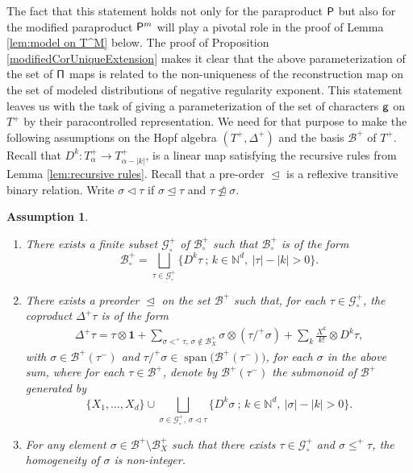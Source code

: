 \documentclass[JEP,XML,SOM,Unicode,published]{cedram}
\DeclareMathOperator{\Span}{span}
\theoremstyle{plain}
\newtheorem{assumption}{Assumption}
\theoremstyle{definition}
\newcommand{\unit}{\mathbf{1}}
\let\pord\trianglelefteq
\let\spord\triangleleft
\newcommand{\mcB}{\mathcal{B}}
\newcommand{\mcG}{\mathcal{G}}
\begin{document}
The fact that this statement holds not only for the paraproduct $\sf P$ but also for the modified paraproduct ${\sf P}^m$ will play a pivotal role in the proof of Lemma \ref{lem:model on T^M} below. The proof of Proposition \ref{modifiedCorUniqueExtension} makes it clear that the above parameterization of the set of $\sf \Pi$ maps is related to the non-uniqueness of the reconstruction map on the set of modeled distributions of negative regularity exponent. This statement leaves us with the task of giving a parameterization of the set of characters $\sf g$ on $T^+$ by their paracontrolled representation. We need for that purpose to make the following assumptions on the Hopf algebra $(T^+,\Delta^+)$ and the basis $\mcB^+$ of $T^+$. Recall that $D^k:T_\alpha^+\to T_{\alpha-|k|}^+$, is a linear map satisfying the recursive rules from Lemma \ref{lem:recursive rules}. Recall that a pre-order $\pord$ is a reflexive transitive binary relation. Write $\sigma\spord\tau$ if $\sigma\pord\tau$ and $\tau\ntrianglelefteq\sigma$.

\skpt
\begin{assumption}\label{ass:C}
\begin{enumerate}
\item\label{ass:C1}
There exists a finite subset $\mcG_\circ^+$ of $\mcB_\circ^+$ such that $\mcB_\circ^+$ is of the form
\[
\mcB_\circ^+ = \bigsqcup_{\tau\in\mcG_\circ^+} \bigl\{D^k\tau\ ;\, k\in\mathbb{N}^d,\ |\tau|-|k|>0\bigr\}.
\]
	\item\label{ass:C2}
	There exists a preorder $\pord$ on the set $\mcB^+$ such that, for each $\tau\in\mcG_\circ^+$,
	the coproduct $\Delta^+\tau$ is of the form
\begin{align}\label{eq:canonical coproduct}
\Delta^+\tau=\tau\otimes\unit+\sum_{\sigma<^+\tau,\, \sigma\notin\mcB_X^+}\sigma\otimes(\tau/^+\sigma) + \sum_{k}\frac{X^{k}}{k!}\otimes D^k\tau,
\end{align}
with $\sigma\in\mcB^+(\tau^-)$ and $\tau/^+\sigma\in\Span\bigl(\mcB^+(\tau^-)\bigr)$, for each $\sigma$ in the above sum,
where for each $\tau\in\mcB^+$, denote by $\mcB^+(\tau^-)$ the submonoid of $\mcB^+$ generated by
\[
\big\{X_1,\dots,X_d\big\}\cup\bigsqcup_{\sigma\in\mcG_\circ^+,\, \sigma\spord\tau} \bigl\{D^k\sigma\ ;\, k\in\mathbb{N}^d,\ |\sigma|-|k|>0\bigr\}.
\]

\item\label{ass:C3}
For any element $\sigma\in\mcB^+\setminus\mcB_X^+$ such that there exists $\tau\in\mcG_\circ^+$ and $\sigma\le^+\tau$, the homogeneity of $\sigma$ is non-integer.
\end{enumerate}
\end{assumption}
\end{document}
